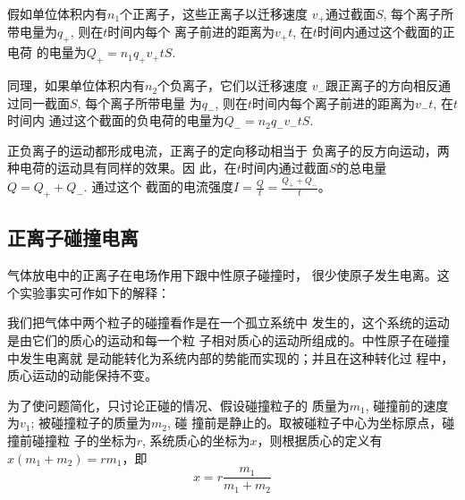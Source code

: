假如单位体积内有$n_1$个正离子，这些正离子以迁移速度
$v_+$通过截面$S$, 每个离子所带电量为$q_+$, 则在$t$时间内每个
离子前进的距离为$v_+t$, 在$t$时间内通过这个截面的正电荷
的电量为$Q_+=n_1q_+v_+tS$.

同理，如果单位体积内有$n_2$个负离子，它们以迁移速度
$v_-$跟正离子的方向相反通过同一截面$S$, 每个离子所带电量
为$q_-$, 则在$t$时间内每个离子前进的距离为$v_-t$, 在$t$时间内
通过这个截面的负电荷的电量为$Q_-=n_2q_-v_-tS$. 

正负离子的运动都形成电流，正离子的定向移动相当于
负离子的反方向运动，两种电荷的运动具有同样的效果。因
此，在$t$时间内通过截面$S$的总电量$Q=Q_+ +Q_-$. 通过这个
截面的电流强度$I=\frac{Q}{t}=\frac{Q_+ +Q_-}{t}$。

\subsection{正离子碰撞电离}
气体放电中的正离子在电场作用下跟中性原子碰撞时，
很少使原子发生电离。这个实验事实可作如下的解释：

我们把气体中两个粒子的碰撞看作是在一个孤立系统中
发生的，这个系统的运动是由它们的质心的运动和每一个粒
子相对质心的运动所组成的。中性原子在碰撞中发生电离就
是动能转化为系统内部的势能而实现的；并且在这种转化过
程中，质心运动的动能保持不变。

为了使问题简化，只讨论正碰的情况、假设碰撞粒子的
质量为$m_1$, 碰撞前的速度为$v_1$; 被碰撞粒子的质量为$m_2$, 碰
撞前是静止的。取被碰粒子中心为坐标原点，碰撞前碰撞粒
子的坐标为$r$, 系统质心的坐标为$x$，则根据质心的定义有
$x(m_1+m_2)=rm_1$，即
\[x=r\frac{m_1}{m_1+m_2}\]
